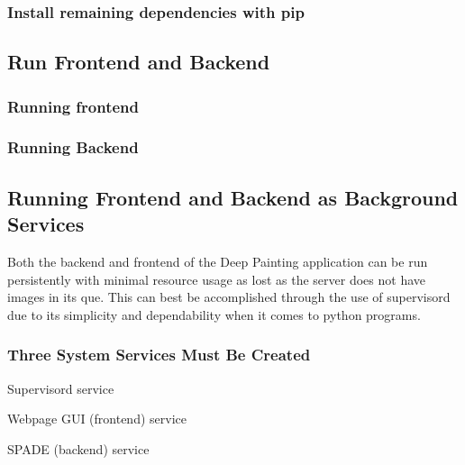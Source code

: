 \subsubsection*{Install remaining dependencies with pip}


\begin{DoxyCode}{0}
\end{DoxyCode}


\subsection*{Run Frontend and Backend}

\subsubsection*{Running frontend}


\begin{DoxyCode}{0}
\end{DoxyCode}
 \subsubsection*{Running Backend}


\begin{DoxyCode}{0}
\end{DoxyCode}


\subsection*{Running Frontend and Backend as Background Services}

Both the backend and frontend of the Deep Painting application can be run persistently with minimal resource usage as lost as the server does not have images in its que. This can best be accomplished through the use of supervisord due to its simplicity and dependability when it comes to python programs.

\subsubsection*{Three System Services Must Be Created}


\begin{DoxyItemize}
\item Supervisord service
\begin{DoxyItemize}
\item Webpage G\+UI (frontend) service
\item S\+P\+A\+DE (backend) service
\end{DoxyItemize}
\end{DoxyItemize}

